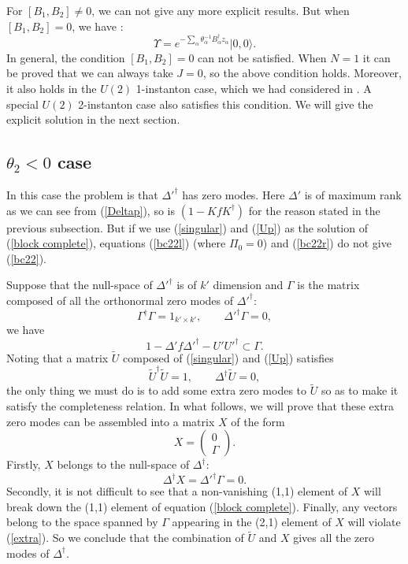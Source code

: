 \documentclass[a4paper,a4paper]{article}
\begin{document}
For $[B_1,B_2]\ne 0$, we can not give any more explicit results.
But when $[B_1,B_2]=0$, we have \cite{Paperc}:
\begin{equation}
\Upsilon= e^{-\sum_\alpha\theta_\alpha^{-1}B_\alpha^\dag
z_\alpha}|0,0\rangle.
\end{equation}
In general, the condition $[B_1,B_2]=0$ can not be satisfied. When
$N=1$ it can be proved \cite{Nakajima} that we can always take
$J=0$, so the above condition holds. Moreover, it also holds in
the $U(2)$ 1-instanton case, which we had considered in
\cite{TianZhu}. A special $U(2)$ 2-instanton case also satisfies
this condition. We will give the explicit solution in the next
section.

\subsection{$\theta_2<0$ case}

In this case the problem is that $\Delta'^\dag$ has zero modes.
Here $\Delta'$ is of maximum rank as we can see from
(\ref{Deltap}), so is $(1-KfK^\dag)$ for the reason stated in the
previous subsection. But if we use (\ref{singular}) and (\ref{Up})
as the solution of (\ref{block complete}), equations (\ref{bc22l})
(where $\Pi_0=0$) and (\ref{bc22r}) do not give (\ref{bc22}).

Suppose that the null-space of $\Delta'^\dag$ is of $k'$ dimension
and $\Gamma$ is the matrix composed of all the orthonormal zero
modes of $\Delta'^\dag$:
\begin{equation}
\Gamma^\dag\Gamma=1_{k'\times k'},\qquad\Delta'^\dag\Gamma=0,
\end{equation}
we have
\begin{equation}\label{extra}
1-\Delta'f\Delta'^\dag-U'U'^\dag\subset\Gamma.
\end{equation}
Noting that a matrix $\tilde{U}$ composed of (\ref{singular}) and
(\ref{Up}) satisfies
\begin{equation}
\tilde{U}^\dag\tilde{U}=1,\qquad\Delta^\dag\tilde{U}=0,
\end{equation}
the only thing we must do is to add some extra zero modes to
$\tilde{U}$ so as to make it satisfy the completeness relation. In
what follows, we will prove that these extra zero modes can be
assembled into a matrix $X$ of the form
\begin{equation}
X=\left(\begin{array}{c} 0 \\ \Gamma \end{array}\right) .
\end{equation}
Firstly, $X$ belongs to the null-space of $\Delta^\dag$:
\begin{equation}
\Delta^\dag X=\Delta'^\dag\Gamma=0.
\end{equation}
Secondly, it is not difficult to see that a non-vanishing (1,1)
element of $X$ will break down the (1,1) element of equation
(\ref{block complete}). Finally, any vectors belong to the space
spanned by $\Gamma$ appearing in the (2,1) element of $X$ will
violate (\ref{extra}). So we conclude that the combination of
$\tilde{U}$ and $X$ gives all the zero modes of $\Delta^\dag$.
\end{document}
